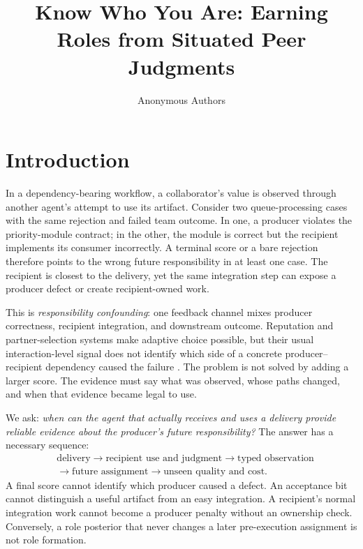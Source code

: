 \documentclass[sigconf,anonymous]{aamas}
\title[Know Who You Are]{Know Who You Are: Earning Roles from Situated Peer Judgments}
\author{Anonymous Authors}
\affiliation{\institution{Internal research draft}}
\begin{document}
\maketitle

\section{Introduction}

In a dependency-bearing workflow, a collaborator's value is observed through another agent's attempt to use its artifact. Consider two queue-processing cases with the same rejection and failed team outcome. In one, a producer violates the priority-module contract; in the other, the module is correct but the recipient implements its consumer incorrectly. A terminal score or a bare rejection therefore points to the wrong future responsibility in at least one case. The recipient is closest to the delivery, yet the same integration step can expose a producer defect or create recipient-owned work.

This is \emph{responsibility confounding}: one feedback channel mixes producer correctness, recipient integration, and downstream outcome. Reputation and partner-selection systems make adaptive choice possible, but their usual interaction-level signal does not identify which side of a concrete producer--recipient dependency caused the failure \cite{sabater2002reputation,pinyol2013trust,leung2025partner,russell2026partner}. The problem is not solved by adding a larger score. The evidence must say what was observed, whose paths changed, and when that evidence became legal to use.

We ask: \emph{when can the agent that actually receives and uses a delivery provide reliable evidence about the producer's future responsibility?} The answer has a necessary sequence:
\begin{equation}
\begin{aligned}
&\text{delivery}\rightarrow\text{recipient use and judgment}\rightarrow\text{typed observation}\\
&\rightarrow\text{future assignment}\rightarrow\text{unseen quality and cost}.
\end{aligned}
\label{eq:story}
\end{equation}
A final score cannot identify which producer caused a defect. An acceptance bit cannot distinguish a useful artifact from an easy integration. A recipient's normal integration work cannot become a producer penalty without an ownership check. Conversely, a role posterior that never changes a later pre-execution assignment is not role formation.
\end{document}
